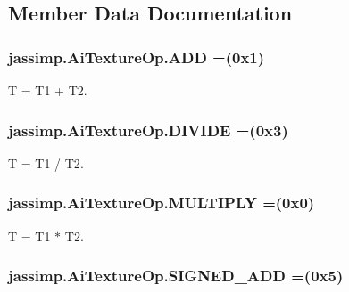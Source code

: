 \subsection{Member Data Documentation}
\hypertarget{enumjassimp_1_1_ai_texture_op_a471d0c16986820ceafbed7ea5b9761df}{
\subsubsection[{A\+D\+D}]{\setlength{\rightskip}{0pt plus 5cm}jassimp.\+Ai\+Texture\+Op.\+A\+D\+D =(0x1)}}\label{enumjassimp_1_1_ai_texture_op_a471d0c16986820ceafbed7ea5b9761df}
{\ttfamily T = T1 + T2}. \hypertarget{enumjassimp_1_1_ai_texture_op_a016c114cb509acd1e5b837e9ae7b95f3}{
\subsubsection[{D\+I\+V\+I\+D\+E}]{\setlength{\rightskip}{0pt plus 5cm}jassimp.\+Ai\+Texture\+Op.\+D\+I\+V\+I\+D\+E =(0x3)}}\label{enumjassimp_1_1_ai_texture_op_a016c114cb509acd1e5b837e9ae7b95f3}
{\ttfamily T = T1 / T2}. \hypertarget{enumjassimp_1_1_ai_texture_op_a451707cd7f58744be7e908fe394b491f}{
\subsubsection[{M\+U\+L\+T\+I\+P\+L\+Y}]{\setlength{\rightskip}{0pt plus 5cm}jassimp.\+Ai\+Texture\+Op.\+M\+U\+L\+T\+I\+P\+L\+Y =(0x0)}}\label{enumjassimp_1_1_ai_texture_op_a451707cd7f58744be7e908fe394b491f}
{\ttfamily T = T1 $\ast$ T2}. \hypertarget{enumjassimp_1_1_ai_texture_op_adc2d6b04f7a93e5c23cc7cd240cc9ecb}{
\subsubsection[{S\+I\+G\+N\+E\+D\+\_\+\+A\+D\+D}]{\setlength{\rightskip}{0pt plus 5cm}jassimp.\+Ai\+Texture\+Op.\+S\+I\+G\+N\+E\+D\+\_\+\+A\+D\+D =(0x5)}}\label{enumjassimp_1_1_ai_texture_op_adc2d6b04f7a93e5c23cc7cd240cc9ecb}
